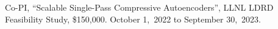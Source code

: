 \item Co-PI,
	``Scalable Single-Pass Compressive Autoencoders'',
	LLNL LDRD Feasibility Study,
	\$150,000.
	October 1,~2022 to September 30,~2023.
